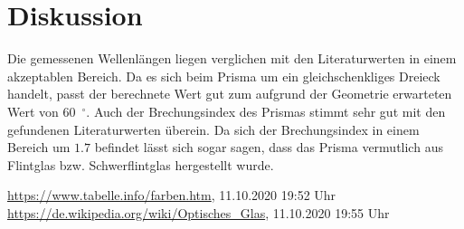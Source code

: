 \documentclass{article}
\begin{document}
\section{Diskussion}

Die gemessenen Wellenlängen liegen verglichen mit den Literaturwerten \cite{other} in einem akzeptablen Bereich.
Da es sich beim Prisma um ein gleichschenkliges Dreieck handelt, passt der berechnete Wert gut zum aufgrund der Geometrie erwarteten Wert von 60~${}^\circ$.
Auch der Brechungsindex des Prismas stimmt sehr gut mit den gefundenen Literaturwerten \cite{wiki} überein. Da sich der Brechungsindex in einem Bereich um $1.7$ befindet lässt sich sogar sagen, dass das Prisma vermutlich aus Flintglas bzw. Schwerflintglas hergestellt wurde.








\begin{thebibliography}{9}
 \url{https://www.tabelle.info/farben.htm}, 11.10.2020 19:52 Uhr
 \url{https://de.wikipedia.org/wiki/Optisches_Glas}, 11.10.2020 19:55 Uhr
\end{thebibliography}






%

%


%
\end{document}
